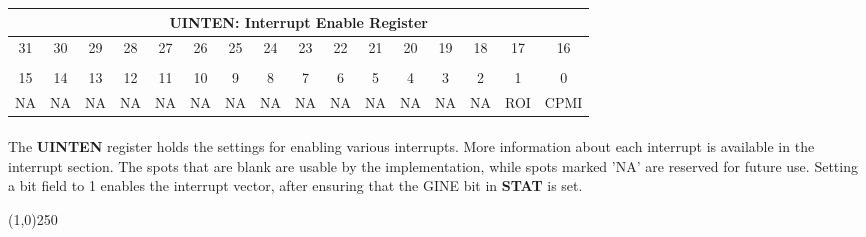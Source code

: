 \documentclass[letterpaper, 11pt]{article}
\begin{document}
\begin{center}
	\begin{tabular}{|c|c|c|c|c|c|c|c|c|c|c|c|c|c|c|c|}
			\multicolumn{16}{c}{\textbf{UINTEN}: Interrupt Enable Register}  \\ \hline

		 	31 	& 30  	&  29   &	28	&	27	&	26 	&   25 		&	24 & 23 	& 22  	&  21  	&	20	&	19	&	18 	&   17 		&	16 		\\ 
			\hspace{5pt} 	& \hspace{5pt} 	& \hspace{5pt} 	& \hspace{5pt} 	& \hspace{5pt}	& \hspace{5pt} 	& \hspace{5pt}	& \hspace{5pt}   &
			\hspace{5pt} 	& \hspace{5pt} 	& \hspace{5pt} 	& \hspace{5pt} 	& \hspace{5pt}	& \hspace{5pt} 	& \hspace{5pt}	& \hspace{5pt}    \\ \hline
		 	15 	& 14  	&  13   &	12	&	11	&	10 	&	9 		&	8 & 7 	& 6  	&  5   	&	4	&	3	&	2  	&	1 		&	0 		\\ 
			NA 	& NA 	& NA 	& NA 	& NA 	& NA 	& NA 		& NA   &
			NA 	& NA 	& NA 	& NA 	& NA 	& NA   	& ROI  		& CPMI    \\ \hline
		
	\end{tabular}
\end{center}

\paragraph{} The \textbf{UINTEN} register holds the settings for enabling various interrupts. More information about each interrupt
is available in the interrupt section. The spots that are blank are usable by the implementation, while spots marked 'NA'
are reserved for future use. Setting a bit field to 1 enables the interrupt vector, after ensuring that the GINE bit in \textbf{STAT} is set.

\begin{center}
	\line(1,0){250}
\end{center}
\vspace{0.2 cm}
\clearpage
\end{document}
